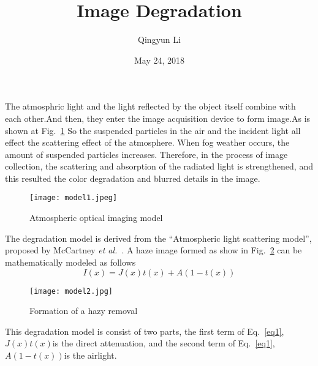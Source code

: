 \documentclass{article}
\author{Qingyun Li}
\date{May 24, 2018}
\title{Image Degradation}
\begin{document}
\maketitle
 \par The atmosphric light and the light reflected by the object itself combine with each other.And then, they enter the image acquisition device to form image.As is shown at Fig.~\ref{model1} So the suspended particles in the air and the incident light all effect the scattering effect of the atmosphere. When fog weather occurs, the amount of suspended particles increases. Therefore, in the process of image collection, the scattering and absorption of the radiated light is strengthened, and this resulted the color degradation and blurred details in the image.
\begin{figure}[htbp]
\begin{minipage}{1\linewidth}
 \centering{}
\texttt{[image: model1.jpeg]}\\
 \caption{Atmospheric optical imaging model}
\label{model1}
\end{minipage}
\end{figure}
 \par The degradation model is derived from the “Atmospheric light scattering model”, proposed by McCartney \emph{et al.}~\cite{Mccartney1976Optics}. A haze image formed as show in Fig.~\ref{model2} can be mathematically modeled as follows
\begin{equation}
I(x)=J(x)t(x)+A(1-t(x)) \label{eq1}
\end{equation}
\begin{figure}[htbp]
\begin{minipage}{1\linewidth}
 \centering{}
\texttt{[image: model2.jpg]}\\
 \caption{Formation of a hazy removal}
\label{model2}
\end{minipage}
\end{figure}
\par This degradation model is consist of two parts, the first term of Eq.~\ref{eq1}, $J(x)t(x)$is the direct attenuation, and the second term of Eq.~\ref{eq1}, $A(1-t(x))$is the airlight.
 
 
\end{document}
